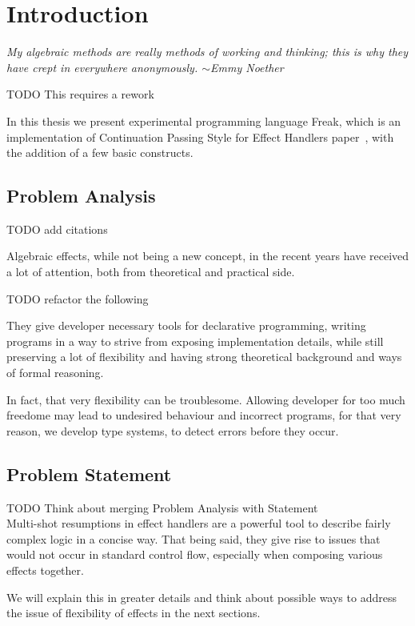 \documentclass[declaration,shortabstract]{iithesis}
\author{Mateusz Urbańczyk}
\date{1 września 2020}                     %
\theoremstyle{definition} \newtheorem{definition}{Definition}[chapter]
\theoremstyle{remark} \newtheorem{remark}[definition]{Observation}
\theoremstyle{plain} \newtheorem{theorem}[definition]{Theorem}
\theoremstyle{plain} \newtheorem{lemma}[definition]{Lemma}
\begin{document}
\chapter{Introduction}

\textit{
    My algebraic methods are really methods of working and thinking; this is why
    they have crept in everywhere anonymously. $\sim{}$Emmy Noether
}

TODO This requires a rework

In this thesis we present experimental programming language Freak, which is an
implementation of Continuation Passing Style for Effect Handlers paper~\cite{handlers-cps},
with the addition of a few basic constructs.

\section{Problem Analysis}

TODO add citations

Algebraic effects, while not being a new concept, in the recent years
have received a lot of attention, both from theoretical and practical side.

TODO refactor the following

They give developer necessary tools for declarative programming, writing
programs in a way to strive from exposing implementation details, while still
preserving a lot of flexibility and having strong theoretical background and
ways of formal reasoning.

In fact, that very flexibility can be troublesome. Allowing developer for too
much freedome may lead to undesired behaviour and incorrect programs, for that
very reason, we develop type systems, to detect errors before they occur.

\section{Problem Statement}

TODO Think about merging Problem Analysis with Statement \\

Multi-shot resumptions in effect handlers are a powerful tool to describe
fairly complex logic in a concise way. That being said, they give rise to
issues that would not occur in standard control flow, especially when composing
various effects together.

We will explain this in greater details and think about possible ways to address
the issue of flexibility of effects in the next sections.
\end{document}
